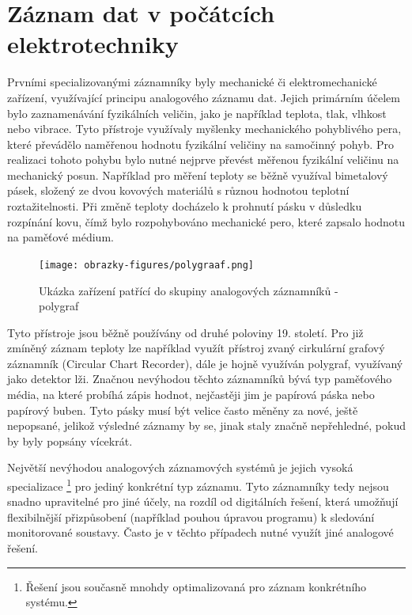 \section{Záznam dat v počátcích elektrotechniky}
\label{zaznam}
Prvními specializovanými záznamníky byly mechanické či elektromechanické zařízení, využívající principu analogového záznamu dat. Jejich primárním účelem bylo zaznamenávání fyzikálních veličin, jako je například teplota, tlak, vlhkost nebo vibrace. Tyto přístroje využívaly myšlenky mechanického pohyblivého pera, které převádělo naměřenou hodnotu fyzikální veličiny na samočinný pohyb. Pro realizaci tohoto pohybu bylo nutné nejprve převést měřenou fyzikální veličinu na mechanický posun. Například pro měření teploty se běžně využíval bimetalový pásek, složený ze dvou kovových materiálů s různou hodnotou teplotní roztažitelnosti. Při změně teploty docházelo k prohnutí pásku v důsledku rozpínání kovu, čímž bylo rozpohybováno mechanické pero, které zapsalo hodnotu na paměťové médium. 


\begin{figure}[h] %
    \centering
    \texttt{[image: obrazky-figures/polygraaf.png]}
    \caption{Ukázka zařízení patřící do skupiny analogových záznamníků - polygraf \cite{polygraph_picture}}
    \label{fig:polygraaf}
\end{figure}


Tyto přístroje jsou běžně používány od druhé poloviny 19. století. Pro již zmíněný záznam teploty lze například využít přístroj zvaný cirkulární grafový záznamník (Circular Chart Recorder), dále je hojně využíván polygraf, využívaný jako detektor lži. Značnou nevýhodou těchto záznamníků bývá typ paměťového média, na které probíhá zápis hodnot, nejčastěji jim je papírová páska nebo papírový buben. Tyto pásky musí být velice často měněny za nové, ještě nepopsané, jelikož výsledné záznamy by se, jinak staly značně nepřehledné, pokud by byly popsány vícekrát. \cite{origin_of_chart_recorders}

Největší nevýhodou analogových záznamových systémů je jejich vysoká specializace \footnote{Řešení jsou současně mnohdy optimalizovaná pro záznam konkrétního systému.} pro jediný konkrétní typ záznamu. Tyto záznamníky tedy nejsou snadno upravitelné pro jiné účely, na rozdíl od digitálních řešení, která umožňují flexibilnější přizpůsobení (například pouhou úpravou programu) k sledování monitorované soustavy. Často je v těchto případech nutné využít jiné analogové řešení. \cite{analog_signal_and_digital_signal_processing_Tel_System}

